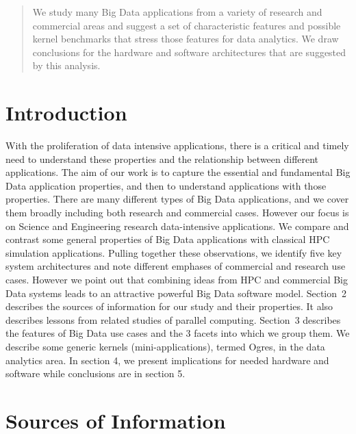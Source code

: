 \documentclass{acm_proc_article-sp}
\begin{document}
\maketitle
\begin{abstract}
We study many Big Data applications from a variety of research and commercial areas and suggest a set of characteristic features and possible kernel benchmarks that stress those features for data analytics. We draw conclusions for the hardware and software architectures that are suggested by this analysis.
\end{abstract}


\section{Introduction}
With the proliferation of data intensive applications, there is a critical and
timely need to understand these properties and the relationship between
different applications. The aim of our work is to capture the essential and
fundamental Big Data application properties, and then to understand
applications with those properties. There are many different types of Big Data
applications, and we cover them broadly including both research and commercial
cases. However our focus is on Science and Engineering research data-intensive
applications. We compare and contrast some general properties of Big Data
applications with classical HPC simulation applications. Pulling together these
observations, we identify five key system architectures and note different
emphases of commercial and research use cases. However we point out that
combining ideas from HPC and commercial Big Data systems leads to an attractive
powerful Big Data software model. Section~2 describes the sources of
information for our study and their properties. It also describes lessons from
related studies of parallel computing. Section~3 describes the features of Big
Data use cases and the 3 facets into which we group them. We describe some
generic kernels (mini-applications), termed Ogres, in the data analytics area.
In section 4, we present implications for needed hardware and software while
conclusions are in section 5.


\section{Sources of Information}
\end{document}
